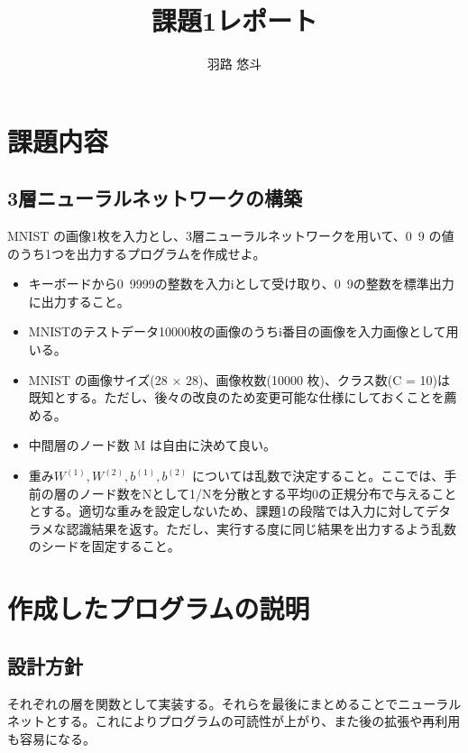 \documentclass[platex,dvipdfmx]{jsarticle}
\begin{document}
  \title{課題1レポート}
  \author{羽路 悠斗}
  \maketitle

  \section{課題内容}

  \subsection{3層ニューラルネットワークの構築}

  MNIST の画像1枚を入力とし、3層ニューラルネットワークを用いて、0~9 の値のうち1つを出力するプログラムを作成せよ。

  \begin{itemize}
    \item キーボードから0~9999の整数を入力iとして受け取り、0~9の整数を標準出力に出力すること。
    \item MNISTのテストデータ10000枚の画像のうちi番目の画像を入力画像として用いる。
    \item MNIST の画像サイズ(28 × 28)、画像枚数(10000 枚)、クラス数(C = 10)は既知とする。ただし、後々の改良のため変更可能な仕様にしておくことを薦める。
    \item 中間層のノード数 M は自由に決めて良い。
    \item 重み$W^{(1)},W^{(2)},b^{(1)},b^{(2)}$ については乱数で決定すること。ここでは、手前の層のノード数をNとして1/Nを分散とする平均0の正規分布で与えることとする。適切な重みを設定しないため、課題1の段階では入力に対してデタラメな認識結果を返す。ただし、実行する度に同じ結果を出力するよう乱数のシードを固定すること。
  \end{itemize}

  \section{作成したプログラムの説明}

  \subsection{設計方針}

  それぞれの層を関数として実装する。それらを最後にまとめることでニューラルネットとする。これによりプログラムの可読性が上がり、また後の拡張や再利用も容易になる。
\end{document}
